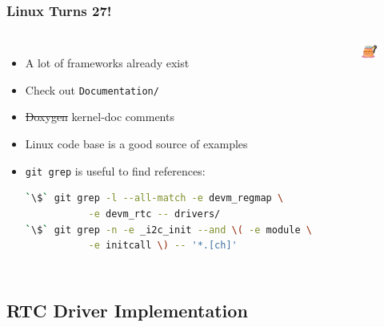 \documentclass[aspectratio=169,usenames,dvipsnames]{beamer}
\newcounter{cont}
\begin{document}
\begin{frame}[containsverbatim]
  \frametitle{Linux Turns 27!}
  \begin{columns}
      \begin{itemize}
        \item A lot of frameworks already exist
        \item Check out \texttt{Documentation/}
	\item \sout{Doxygen} kernel-doc comments
        \item Linux code base is a good source of examples
        \item \texttt{git grep} is useful to find references:
          \begin{lstlisting}[language=bash]
`\$` git grep -l --all-match -e devm_regmap \
           -e devm_rtc -- drivers/
`\$` git grep -n -e _i2c_init --and \( -e module \
           -e initcall \) -- '*.[ch]'
          \end{lstlisting}
      \end{itemize}
      \begin{figure}
        \centering
        \includegraphics[scale=0.4]{images/linux-bday.png}
      \end{figure}
      \vspace*{-6mm}
  \end{columns}
\end{frame}


\subsection{RTC Driver Implementation}
\end{document}
